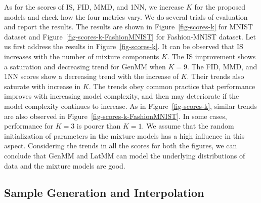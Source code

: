 As for the scores of IS, FID, MMD, and 1NN, we increase $K$ for the proposed models and check
how the four metrics vary. We do several trials of evaluation and
report the results. The results are shown in
Figure~\ref{fig-scores-k} for MNIST dataset and
Figure~\ref{fig-scores-k-FashionMNIST} for Fashion-MNIST dataset. Let us
first address the results in Figure~\ref{fig-scores-k}. It can be
observed that IS increases with the number of mixture components $K$. The IS
improvement shows a saturation and decreasing trend for GenMM when
$K=9$. The FID, MMD, and 1NN scores show a decreasing trend with the
increase of $K$. Their trends also saturate with increase in $K$. The
trends obey common practice that performance improves with
increasing model complexity, and then may deteriorate if the model
complexity continues to increase. As in Figure~\ref{fig-scores-k}, similar trends are also observed in Figure~\ref{fig-scores-k-FashionMNIST}. In some cases, performance for $K=3$ is poorer than $K=1$. We assume that the random initialization of parameters in the mixture models has a high influence in this aspect.
Considering the trends in all the scores for both the figures, we can conclude that GenMM and LatMM can model the underlying distributions of data and the mixture models are good.

\subsection{Sample Generation and Interpolation}


